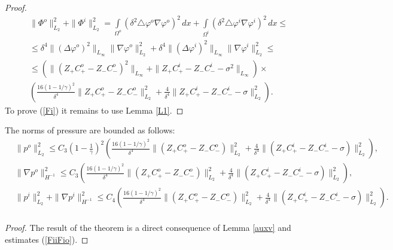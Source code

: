 \documentclass{amsart}
\begin{document}
\begin{proof}


\begin{equation}\label{FiiFio}
\begin{aligned}
&\|\Phi^o\|^2_{L_2}+\|\Phi^i\|^2_{L_2}=\int\limits_{\Omega^o}(\delta^2\triangle \varphi^o\nabla \varphi^o)^2\,dx+\int\limits_{\Omega^i}(\delta^2\triangle \varphi^i\nabla \varphi^i)^2\,dx\leq\\
&\leq\delta^4\|(\Delta \varphi^o)^2\|_{L_{\infty}}\|\nabla \varphi^o\|^2_{L_2}+\delta^4\|(\Delta \varphi^i)^2\|_{L_{\infty}}\|\nabla \varphi^i\|^2_{L_2}\leq\\
&\leq  (\|\left(Z_{+}C^o_{+}-Z_{-}C^o_{-}\right)^2\|_{L_{\infty}}+\|Z_{+}C^i_{+}-Z_{-}C^i_{-}-\sigma^2\|_{L_{\infty}})\times\\
&\left(\frac{16\left(1-1/{\gamma}\right)^2}{\delta^4}\|Z_{+}C^o_{+}-Z_{-}C^o_{-}\|^2_{L_{2}}+\frac{4}{\delta^4}\|Z_{+}C^i_{+}-Z_{-}C^i_{-}-\sigma\|^2_{L_{2}}\right).
\end{aligned}
\end{equation}
To prove (\ref{Fi}) it remains to use Lemma \ref{L1}.
\end{proof}


\begin{lemma}\label{normpr}
The norms of pressure are bounded as follows: 
\begin{equation}\label{pr}
\begin{aligned}
&\| p^o\|^2_{L_2}\leq C_3\left(1-\frac{1}{\gamma}\right)^2
\left(\frac{16\left(1-1/{\gamma}\right)^2}{\delta^4}\|\left(Z_{+}C^o_{+}-Z_{-}C^o_{-}\right)\|^2_{L_{2}}+\frac{4}{\delta^4}\|\left(Z_{+}C^i_{+}-Z_{-}C^i_{-}-\sigma\right)\|^2_{L_{2}}\right),\\
&\| \nabla p^o\|^2_{H^{-1}}\leq C_3
\left(\frac{16\left(1-1/{\gamma}\right)^2}{\delta^4}\|\left(Z_{+}C^o_{+}-Z_{-}C^o_{-}\right)\|^2_{L_{2}}+\frac{4}{\delta^4}\|\left(Z_{+}C^i_{+}-Z_{-}C^i_{-}-\sigma\right)\|^2_{L_{2}}\right),\\
&\| p^i\|^2_{L_2}+\| \nabla p^i\|^2_{H^{-1}}\leq C_4
\left(\frac{16\left(1-1/{\gamma}\right)^2}{\delta^4}\|\left(Z_{+}C^o_{+}-Z_{-}C^o_{-}\right)\|^2_{L_{2}}+\frac{4}{\delta^4}\|\left(Z_{+}C^i_{+}-Z_{-}C^i_{-}-\sigma\right)\|^2_{L_{2}}\right).\\
\end{aligned}
\end{equation}
\end{lemma}



\begin{proof}
The result of the theorem is a direct consequence of Lemma \ref{auxv} and estimates (\ref{FiiFio}).
\end{proof}
\end{document}
